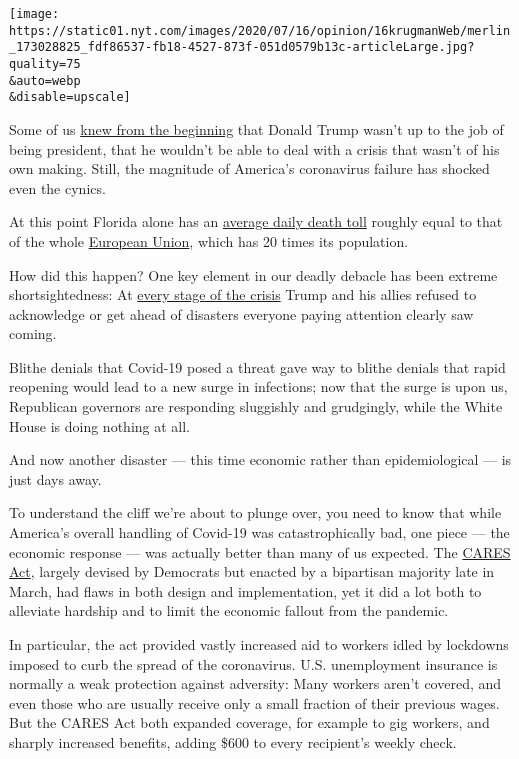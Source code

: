 \texttt{[image: https://static01.nyt.com/images/2020/07/16/opinion/16krugmanWeb/merlin\_173028825\_fdf86537-fb18-4527-873f-051d0579b13c-articleLarge.jpg?quality=75\\\&auto=webp\\\&disable=upscale]}

Some of us
\href{https://krugman.blogs.nytimes.com/2016/11/11/the-long-haul/}{knew
from the beginning} that Donald Trump wasn't up to the job of being
president, that he wouldn't be able to deal with a crisis that wasn't of
his own making. Still, the magnitude of America's coronavirus failure
has shocked even the cynics.

At this point Florida alone has an
\href{https://covidtracking.com/data/charts/all-metrics-per-state}{average
daily death toll} roughly equal to that of the whole
\href{https://ourworldindata.org/coronavirus-data-explorer?zoomToSelection=true\&deathsMetric=true\&dailyFreq=true\&smoothing=7\&country=USA~EuropeanUnion\&pickerMetric=location\&pickerSort=asc}{European
Union}, which has 20 times its population.

How did this happen? One key element in our deadly debacle has been
extreme shortsightedness: At
\href{https://twitter.com/TBPInvictus/status/1281256803788107776}{every
stage of the crisis} Trump and his allies refused to acknowledge or get
ahead of disasters everyone paying attention clearly saw coming.

Blithe denials that Covid-19 posed a threat gave way to blithe denials
that rapid reopening would lead to a new surge in infections; now that
the surge is upon us, Republican governors are responding sluggishly and
grudgingly, while the White House is doing nothing at all.

And now another disaster --- this time economic rather than
epidemiological --- is just days away.

To understand the cliff we're about to plunge over, you need to know
that while America's overall handling of Covid-19 was catastrophically
bad, one piece --- the economic response --- was actually better than
many of us expected. The
\href{https://www.nytimes.com/2020/03/26/us/coronavirus-senate-stimulus-package.html}{CARES
Act}, largely devised by Democrats but enacted by a bipartisan majority
late in March, had flaws in both design and implementation, yet it did a
lot both to alleviate hardship and to limit the economic fallout from
the pandemic.

In particular, the act provided vastly increased aid to workers idled by
lockdowns imposed to curb the spread of the coronavirus. U.S.
unemployment insurance is normally a weak protection against adversity:
Many workers aren't covered, and even those who are usually receive only
a small fraction of their previous wages. But the CARES Act both
expanded coverage, for example to gig workers, and sharply increased
benefits, adding \$600 to every recipient's weekly check.

